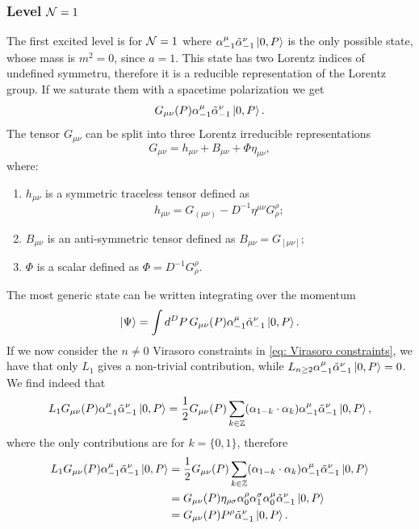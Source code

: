 \subsubsection{Level \texorpdfstring{$\mathcal{N} = 1$}{N = 1}}
The first excited level is for $\mathcal{N} = 1$ where $\alpha^\mu_{-1}\tilde{\alpha}^\nu_{-1}\ket{0,P}$ is the only possible state, whose mass is $m^2 = 0$, since $a = 1$. This state has two Lorentz indices of undefined symmetru, therefore it is a reducible representation of the Lorentz group. If we saturate them with a spacetime polarization we get
\begin{equation}
    G_{\mu\nu}(P)\alpha^\mu_{-1}\tilde{\alpha}^\nu_{-1}\ket{0,P}.
\end{equation}
The tensor $G_{\mu\nu}$ can be split into three Lorentz irreducible representations 
\begin{equation}
\label{eq: polarization tensor irreps}
    G_{\mu\nu} = h_{\mu\nu} + B_{\mu\nu} + \Phi\eta_{\mu\nu},
\end{equation}
where:
\begin{enumerate}
    \item $h_{\mu\nu}$ is a symmetric traceless tensor defined as 
    \begin{equation}
        h_{\mu\nu} = G_{(\mu\nu)} - D^{-1}\eta^{\mu\nu}G^\rho_\rho;
    \end{equation}
    \item $B_{\mu\nu}$ is an anti-symmetric tensor defined as $B_{\mu\nu} = G_{[\mu\nu]}$;
    \item $\Phi$ is a scalar defined as $\Phi = D^{-1}G^\rho_\rho$.
\end{enumerate}
The most generic state can be written integrating over the momentum 
\begin{eqnarray}
    \ket{\Psi} = \int d^DP\,G_{\mu\nu}(P)\alpha^\mu_{-1}\tilde{\alpha}^\nu_{-1}\ket{0,P}.
\end{eqnarray}
If we now consider the $n \neq 0$ Virasoro constraints in \eqref{eq: Virasoro constraints}, we have that only $L_1$ gives a non-trivial contribution, while $L_{n\ge2}\alpha^\mu_{-1}\tilde{\alpha}^\nu_{-1}\ket{0,P} = 0$. We find indeed that 
\begin{equation}
    L_1G_{\mu\nu}(P)\alpha^\mu_{-1}\tilde{\alpha}^\nu_{-1}\ket{0,P} = \frac{1}{2}G_{\mu\nu}(P)\sum_{k\in\mathbb{Z}}(\alpha_{1 - k}\cdot\alpha_{k})\alpha^\mu_{-1}\tilde{\alpha}^\nu_{-1}\ket{0,P},
\end{equation}
where the only contributions are for $k = \{0,1\}$, therefore 
\begin{equation}
    \begin{split}
        L_1G_{\mu\nu}(P)\alpha^\mu_{-1}\tilde{\alpha}^\nu_{-1}\ket{0,P} &= \frac{1}{2}G_{\mu\nu}(P)\sum_{k\in\mathbb{Z}}(\alpha_{1 - k}\cdot\alpha_{k})\alpha^\mu_{-1}\tilde{\alpha}^\nu_{-1}\ket{0,P} \\
        &= G_{\mu\nu}(P)\eta_{\rho\sigma}\alpha^\rho_0\alpha^\sigma_1\alpha^\mu_0\tilde{\alpha}^\nu_{-1}\ket{0,P} \\
        &= G_{\mu\nu}(P)P^\rho\tilde{\alpha}^\nu_{-1}\ket{0,P}.
    \end{split}
\end{equation}
